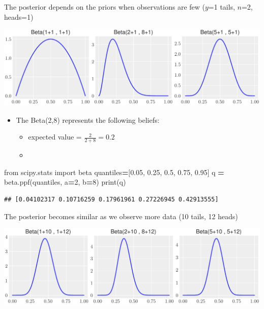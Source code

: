 \documentclass[
  13pt,
  ignorenonframetext,
]{beamer}
\newenvironment{Shaded}{\begin{snugshade}}{\end{snugshade}}
\newcommand{\BuiltInTok}[1]{#1}
\newcommand{\DecValTok}[1]{\textcolor[rgb]{0.00,0.00,0.81}{#1}}
\newcommand{\FloatTok}[1]{\textcolor[rgb]{0.00,0.00,0.81}{#1}}
\newcommand{\ImportTok}[1]{#1}
\newcommand{\NormalTok}[1]{#1}
\newcommand{\OperatorTok}[1]{\textcolor[rgb]{0.81,0.36,0.00}{\textbf{#1}}}
\providecommand{\tightlist}{%
  \setlength{\itemsep}{0pt}\setlength{\parskip}{0pt}}
\begin{document}
\begin{frame}[fragile]{The posterior depends on the priors when
observations are few (\(y\)=1 tails, \(n\)=2, heads=1)}
\protect\hypertarget{the-posterior-depends-on-the-priors-when-observations-are-few-y1-tails-n2-heads1}{}
\begin{center}\includegraphics{3-coinTossing_files/figure-beamer/unnamed-chunk-9-3} \end{center}

\begin{itemize}
\tightlist
\item
  The Beta(2,8) represents the following beliefs:

  \begin{itemize}
  \tightlist
  \item
    expected value = \(\frac{2}{2+8}=0.2\)
  \item
  \end{itemize}
\end{itemize}

\begin{Shaded}
\begin{Highlighting}[]
\ImportTok{from}\NormalTok{ scipy.stats }\ImportTok{import}\NormalTok{ beta}
\NormalTok{quantiles}\OperatorTok{=}\NormalTok{[}\FloatTok{0.05}\NormalTok{, }\FloatTok{0.25}\NormalTok{, }\FloatTok{0.5}\NormalTok{, }\FloatTok{0.75}\NormalTok{, }\FloatTok{0.95}\NormalTok{]}
\NormalTok{q }\OperatorTok{=}\NormalTok{ beta.ppf(quantiles, a}\OperatorTok{=}\DecValTok{2}\NormalTok{, b}\OperatorTok{=}\DecValTok{8}\NormalTok{)}
\BuiltInTok{print}\NormalTok{(q)}
\end{Highlighting}
\end{Shaded}

\begin{verbatim}
## [0.04102317 0.10716259 0.17961961 0.27226945 0.42913555]
\end{verbatim}
\end{frame}

\begin{frame}{The posterior becomes similar as we observe more data (10
tails, 12 heads)}
\protect\hypertarget{the-posterior-becomes-similar-as-we-observe-more-data-10-tails-12-heads}{}
\begin{center}\includegraphics{3-coinTossing_files/figure-beamer/unnamed-chunk-11-5} \end{center}
\end{frame}
\end{document}
